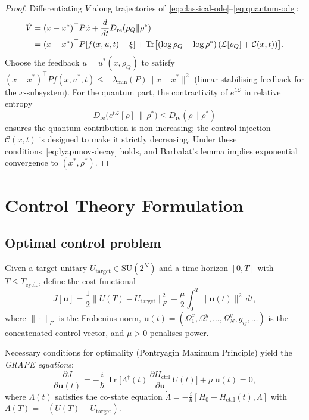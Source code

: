 \begin{proof}
Differentiating $V$ along trajectories of~\eqref{eq:classical-ode}--\eqref{eq:quantum-ode}:
\begin{align}
  \dot{V}
  &= (x - x^*)^\top P \dot{x}
  + \frac{d}{dt} D_{\mathrm{re}}(\rho_Q\|\rho^*) \notag\\
  &= (x - x^*)^\top P [f(x, u, t) + \xi]
  + \operatorname{Tr}\bigl[
      (\log\rho_Q - \log\rho^*)\,
      (\mathcal{L}[\rho_Q] + \mathcal{C}(x,t))
    \bigr].
\end{align}
Choose the feedback $u = u^*(x, \rho_Q)$ to satisfy
$(x - x^*)^\top P f(x, u^*, t) \leq -\lambda_{\min}(P) \|x - x^*\|^2$
(linear stabilising feedback for the $x$-subsystem).  For the quantum
part, the contractivity of $e^{t\mathcal{L}}$ in relative entropy
\[
  D_{\mathrm{re}}\!\bigl(e^{t\mathcal{L}}[\rho]\,\big\|\,\rho^*\bigr)
  \leq D_{\mathrm{re}}(\rho\|\rho^*)
\]
ensures the quantum contribution is non-increasing; the control
injection $\mathcal{C}(x,t)$ is designed to make it strictly
decreasing.  Under these conditions~\eqref{eq:lyapunov-decay} holds,
and Barbalat's lemma implies exponential convergence to $(x^*, \rho^*)$.
\end{proof}

\section{Control Theory Formulation}
\label{sec:ch21-control}

\subsection{Optimal control problem}

Given a target unitary $U_{\mathrm{target}} \in \mathrm{SU}(2^N)$ and a
time horizon $[0, T]$ with $T \leq T_{\mathrm{cycle}}$, define the
cost functional
\begin{equation}\label{eq:cost}
  J[\mathbf{u}]
  = \frac{1}{2}
    \bigl\|U(T) - U_{\mathrm{target}}\bigr\|_F^2
  + \frac{\mu}{2} \int_0^T \|\mathbf{u}(t)\|^2\,dt,
\end{equation}
where $\|\cdot\|_F$ is the Frobenius norm, $\mathbf{u}(t) =
(\Omega_1^x, \Omega_1^y, \dots, \Omega_N^y, g_{ij}, \dots)$ is the
concatenated control vector, and $\mu > 0$ penalises power.

Necessary conditions for optimality (Pontryagin Maximum Principle)
yield the \emph{GRAPE equations}:
\begin{equation}\label{eq:grape}
  \frac{\partial J}{\partial \mathbf{u}(t)}
  = -\frac{i}{\hbar}
    \operatorname{Tr}\!\bigl[
      \Lambda^\dagger(t)\,
      \frac{\partial H_{\mathrm{ctrl}}}{\partial \mathbf{u}}\,
      U(t)
    \bigr]
    + \mu\,\mathbf{u}(t) = 0,
\end{equation}
where $\Lambda(t)$ satisfies the co-state equation
$\dot{\Lambda} = -\frac{i}{\hbar}[H_0 + H_{\mathrm{ctrl}}(t),\Lambda]$
with $\Lambda(T) = -(U(T) - U_{\mathrm{target}})$.

